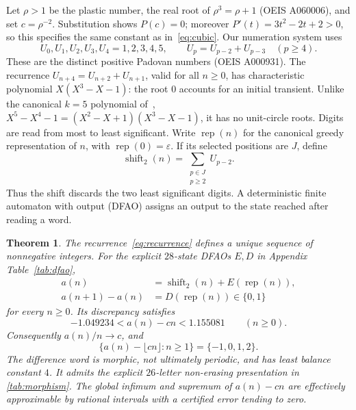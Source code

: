 \documentclass[11pt,a4paper]{article}
\numberwithin{equation}{section}
\newtheorem{theorem}{Theorem}[section]
\theoremstyle{remark}
\newcommand{\eps}{\varepsilon}
\newcommand{\rep}{\operatorname{rep}}
\newcommand{\sh}{\operatorname{shift}_2}
\begin{document}
Let $\rho>1$ be the plastic number, the real root of $\rho^3=\rho+1$
(OEIS A060006), and set $c=\rho^{-2}$.
Substitution shows $P(c)=0$; moreover $P'(t)=3t^2-2t+2>0$, so this specifies
the same constant as in~\eqref{eq:cubic}. Our numeration system uses
\begin{equation}\label{eq:weights}
 U_0,U_1,U_2,U_3,U_4=1,2,3,4,5,\qquad
 U_p=U_{p-2}+U_{p-3}\quad(p\ge4).
\end{equation}
These are the distinct positive Padovan numbers (OEIS A000931).
The recurrence $U_{n+4}=U_{n+2}+U_{n+1}$, valid for all $n\ge0$, has characteristic
polynomial $X(X^3-X-1)$: the root $0$ accounts for an initial transient.
Unlike the canonical $k=5$ polynomial of~\cite{Letouzey},
$X^5-X^4-1=(X^2-X+1)(X^3-X-1)$, it has no unit-circle roots.
Digits are read from most to least significant. Write $\rep(n)$ for the
canonical greedy representation of $n$, with $\rep(0)=\eps$. If its selected
positions are $J$, define
\begin{equation}\label{eq:shift}
 \sh(n)=\sum_{\substack{p\in J\\p\ge2}} U_{p-2}.
\end{equation}
Thus the shift discards the two least significant digits. A deterministic
finite automaton with output (DFAO) assigns an output to the state reached
after reading a word.

\begin{theorem}\label{thm:main}
The recurrence~\eqref{eq:recurrence} defines a unique sequence of nonnegative
integers. For the explicit $28$-state DFAOs $E,D$ in Appendix Table~\ref{tab:dfao},
\begin{align}
 a(n)&=\sh(n)+E(\rep(n)),\label{eq:identification}\\
 a(n+1)-a(n)&=D(\rep(n))\in\{0,1\}\label{eq:difference}
\end{align}
for every $n\ge0$. Its discrepancy satisfies
\begin{equation}\label{eq:mainbound}
 -1.049234<a(n)-cn<1.155081\qquad(n\ge0).
\end{equation}
Consequently $a(n)/n\to c$, and
\begin{equation}\label{eq:offsetset}
 \{a(n)-\lfloor cn\rfloor:n\ge1\}=\{-1,0,1,2\}.
\end{equation}
The difference word is morphic, not ultimately periodic, and has least
balance constant $4$. It admits the
explicit $26$-letter non-erasing presentation in \cref{tab:morphism}.
The global infimum and supremum of $a(n)-cn$ are effectively approximable
by rational intervals with a certified error tending to zero.
\end{theorem}
\end{document}
